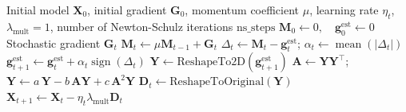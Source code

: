 \documentclass{article}
\begin{document}
\begin{algorithm}[H]
\caption{EF-USignMuon}
\begin{algorithmic}[1]
\Require Initial model $\mathbf{X}_0$, initial gradient $\mathbf{G}_0$, momentum coefficient $\mu$, learning rate $\eta_t$, $\lambda_{\mathrm{mult}}=1$, number of Newton-Schulz iterations $\mathrm{ns\_steps}$
\State $\mathbf{M}_0 \gets 0,\quad \mathbf{g}_0^{\mathrm{est}} \gets 0$
  \State Stochastic gradient $\mathbf{G}_t$
  \State $\mathbf{M}_t \gets \mu\mathbf{M}_{t-1} + \mathbf{G}_t$
  \State $\Delta_t \gets \mathbf{M}_t - \mathbf{g}_t^{\mathrm{est}}$;
  \State $\alpha_t \gets \operatorname{mean}(|\Delta_t|)$
  \State $\mathbf{g}_{t+1}^{\mathrm{est}} \gets \mathbf{g}_t^{\mathrm{est}} + \alpha_t\operatorname{sign}(\Delta_t)$
  \State $\mathbf{Y} \gets \text{ReshapeTo2D}(\mathbf{g}_{t+1}^{\mathrm{est}})$
   
      \State $\mathbf{A} \gets \mathbf{Y}\mathbf{Y}^\top$;
      \State $\mathbf{Y} \gets a\,\mathbf{Y} - b\,\mathbf{A}\mathbf{Y} + c\,\mathbf{A}^2\mathbf{Y}$
  \EndFor
  \State $\mathbf{D}_t \gets \text{ReshapeToOriginal}(\mathbf{Y})$
  \State $\mathbf{X}_{t+1} \gets \mathbf{X}_t - \eta_t\lambda_{\mathrm{mult}}\mathbf{D}_t$
\EndFor
\label{central_alg_ef}
\end{algorithmic}
\end{algorithm}
\end{document}
